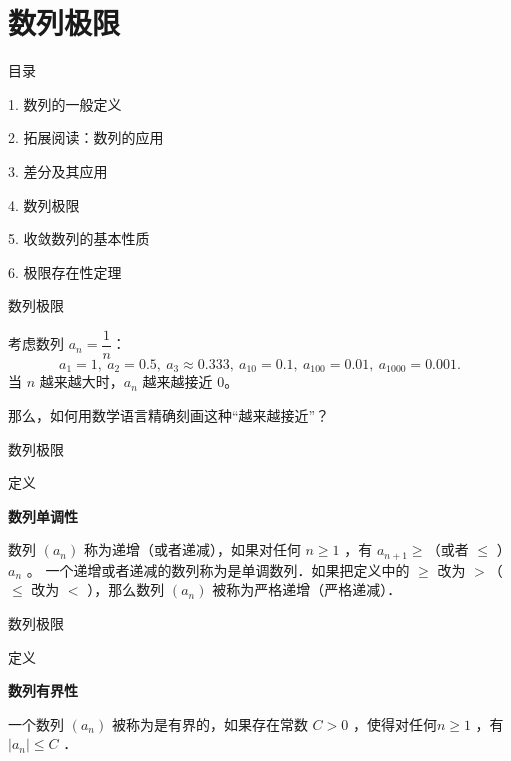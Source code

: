 \documentclass[aspectratio=169,10pt,fontset=fandol]{ctexbeamer}
\begin{document}
\section{数列极限}
\begin{frame}[t,fragile]{目录}
\normalsize
{\color{black}\normalsize 1. 数列的一般定义\par}\vspace{0.22em}
{\color{black}\normalsize 2. 拓展阅读：数列的应用\par}\vspace{0.22em}
{\color{black}\normalsize 3. 差分及其应用\par}\vspace{0.22em}
{\color{blue}\normalsize 4. 数列极限\par}\vspace{0.22em}
{\color{gray!40}\normalsize 5. 收敛数列的基本性质\par}\vspace{0.22em}
{\color{gray!40}\normalsize 6. 极限存在性定理\par}\vspace{0.22em}
\end{frame}
\begin{frame}[t,fragile]{数列极限}
\normalsize
{\normalsize
考虑数列 \(a_n = \dfrac{1}{n}\)：
\[
a_1=1,\ a_2=0.5,\ a_3\approx 0.333,\ a_{10}=0.1,\ a_{100}=0.01,\ a_{1000}=0.001.
\]
当 \(n\) 越来越大时，\(a_n\) 越来越接近 0。


}
{\normalsize
那么，如何用数学语言精确刻画这种“越来越接近”？


}
\end{frame}
\begin{frame}[t,fragile]{数列极限}
\normalsize
\begin{block}{定义}
{\normalsize
\textbf{数列单调性}\par

	数列 $\left(a_n\right)$ 称为递增（或者递减），如果对任何 $n \geqslant 1$ ，有 $a_{n+1} \geqslant$（或者 $\leqslant$ ）$a_n$ 。
	一个递增或者递减的数列称为是单调数列．如果把定义中的 $\geqslant$ 改为 $>$（ $\leqslant$ 改为 $<$ ），那么数列 $\left(a_n\right)$ 被称为严格递增（严格递减）．

}
\end{block}
\end{frame}
\begin{frame}[t,fragile]{数列极限}
\normalsize
\begin{block}{定义}
{\normalsize
\textbf{数列有界性}\par

	 一个数列 $\left(a_n\right)$ 被称为是有界的，如果存在常数 $C>0$ ，使得对任何$n \geqslant 1$ ，有 $\left|a_n\right| \leqslant C$ ．

}
\end{block}
\end{frame}
\end{document}
